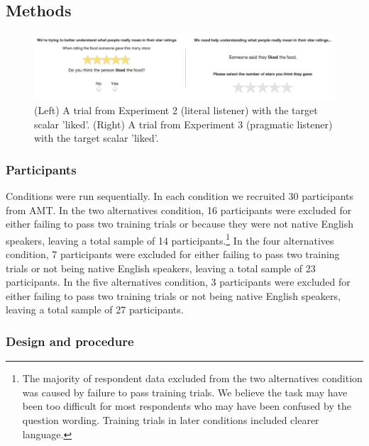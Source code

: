\documentclass[10pt, letterpaper]{article}
\newenvironment{CodeChunk}{}{}
\begin{document}
\subsection{Methods}\label{methods-1}

\begin{CodeChunk}
\begin{figure}[t]

{\centering \includegraphics{figs/stimuli_exp1-1} 

}

\caption[(Left) A trial from Experiment 2 (literal listener) with the target scalar 'liked']{(Left) A trial from Experiment 2 (literal listener) with the target scalar 'liked'. (Right) A trial from Experiment 3 (pragmatic listener) with the target scalar 'liked'.}\label{fig:stimuli_exp1}
\end{figure}
\end{CodeChunk}

\subsubsection{Participants}\label{participants-1}

Conditions were run sequentially. In each condition we recruited 30
participants from AMT. In the two alternatives condition, 16
participants were excluded for either failing to pass two training
trials or because they were not native English speakers, leaving a total
sample of 14
participants.\footnote{The majority of respondent data excluded from the two alternatives condition was caused by failure to pass training trials. We believe the task may have been too difficult for most respondents who may have been confused by the question wording. Training trials in later conditions included clearer language.}
In the four alternatives condition, 7 participants were excluded for
either failing to pass two training trials or not being native English
speakers, leaving a total sample of 23 participants. In the five
alternatives condition, 3 participants were excluded for either failing
to pass two training trials or not being native English speakers,
leaving a total sample of 27 participants.

\subsubsection{Design and procedure}\label{design-and-procedure-1}
\end{document}
